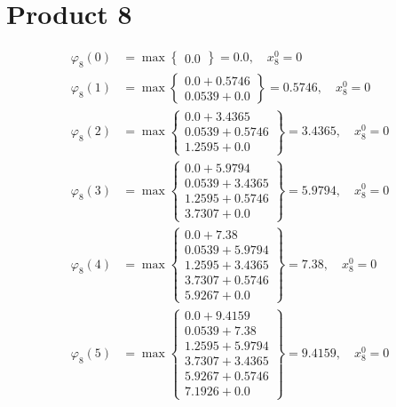 \documentclass{article}
\begin{document}
\section{Product 8}
\begin{align*}
\varphi_{8}(0) &= \max \left\{ \begin{array}{c}
0.0
\end{array} \right\}=0.0, \quad x_{8}^0=0\\
  
\varphi_{8}(1) &= \max \left\{ \begin{array}{c}
0.0 + 0.5746 \\
 0.0539 + 0.0
\end{array} \right\}=0.5746, \quad x_{8}^0=0\\
  
\varphi_{8}(2) &= \max \left\{ \begin{array}{c}
0.0 + 3.4365 \\
 0.0539 + 0.5746 \\
 1.2595 + 0.0
\end{array} \right\}=3.4365, \quad x_{8}^0=0\\
  
\varphi_{8}(3) &= \max \left\{ \begin{array}{c}
0.0 + 5.9794 \\
 0.0539 + 3.4365 \\
 1.2595 + 0.5746 \\
 3.7307 + 0.0
\end{array} \right\}=5.9794, \quad x_{8}^0=0\\
  
\varphi_{8}(4) &= \max \left\{ \begin{array}{c}
0.0 + 7.38 \\
 0.0539 + 5.9794 \\
 1.2595 + 3.4365 \\
 3.7307 + 0.5746 \\
 5.9267 + 0.0
\end{array} \right\}=7.38, \quad x_{8}^0=0\\
  
\varphi_{8}(5) &= \max \left\{ \begin{array}{c}
0.0 + 9.4159 \\
 0.0539 + 7.38 \\
 1.2595 + 5.9794 \\
 3.7307 + 3.4365 \\
 5.9267 + 0.5746 \\
 7.1926 + 0.0
\end{array} \right\}=9.4159, \quad x_{8}^0=0\\
  

\end{align*}
\end{document}
